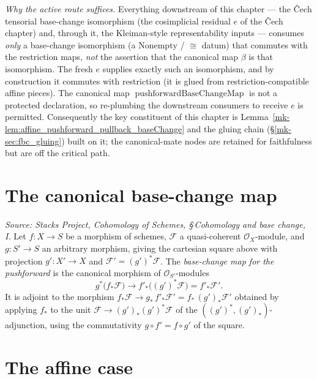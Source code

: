 \emph{Why the active route suffices.} Everything downstream of this chapter --- the
{\v C}ech tensorial base-change isomorphism (the cosimplicial residual \(e\) of the
{\v C}ech chapter) and, through it, the Kleiman-style representability inputs ---
consumes \emph{only} a base-change isomorphism (a \(\mathrm{Nonempty}\) / \(\cong\)
datum) that commutes with the restriction maps, \emph{not} the assertion that the
canonical map \(\beta\) is that isomorphism. The fresh \(e\) supplies exactly such an
isomorphism, and by construction it commutes with restriction (it is glued from
restriction-compatible affine pieces). The canonical map
\(\operatorname{pushforwardBaseChangeMap}\) is not a protected declaration, so
re-plumbing the downstream consumers to receive \(e\) is permitted. Consequently the
key constituent of this chapter is
Lemma~\ref{mk-lem:affine_pushforward_pullback_baseChange} and the gluing chain
(\S\ref{mk-sec:fbc_gluing}) built on it; the canonical-mate nodes are retained for
faithfulness but are off the critical path.

\section{The canonical base-change map}

\begin{definition}\label{mk-def:pushforward_base_change_map}
  \leanok

  \textit{Source: Stacks Project, Cohomology of Schemes, \S\,Cohomology and base
  change, I.}
  Let \(f : X \to S\) be a morphism of schemes, \(\mathcal{F}\) a quasi-coherent
  \(\mathcal{O}_X\)-module, and \(g : S' \to S\) an arbitrary morphism, giving the
  cartesian square above with projection \(g' : X' \to X\) and
  \(\mathcal{F}' = (g')^*\mathcal{F}\). The \emph{base-change map for the
  pushforward} is the canonical morphism of \(\mathcal{O}_{S'}\)-modules
  \[
    g^*\bigl(f_*\mathcal{F}\bigr) \longrightarrow f'_*\bigl((g')^*\mathcal{F}\bigr)
    = f'_*\mathcal{F}' .
  \]
  It is adjoint to the morphism
  \(f_*\mathcal{F} \to g_*\, f'_*\mathcal{F}' = f_*\,(g')_*\mathcal{F}'\) obtained
  by applying \(f_*\) to the unit
  \(\mathcal{F} \to (g')_*(g')^*\mathcal{F}\) of the
  \(((g')^*, (g')_*)\)-adjunction, using the commutativity
  \(g \circ f' = f \circ g'\) of the square.
\end{definition}

\section{The affine case}

